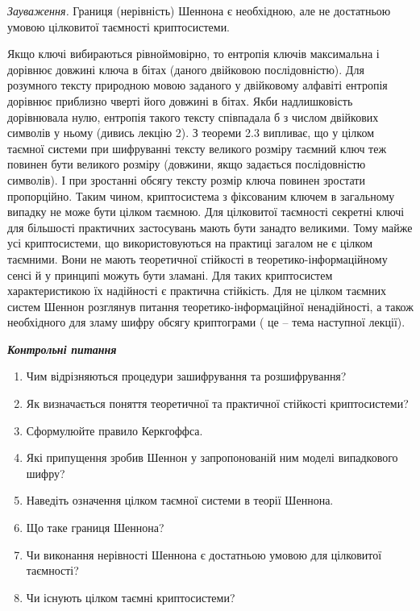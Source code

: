 \documentclass[a4paper]{article}
\newcommand\liststyleWWviiiNumxlv{%
\renewcommand\theenumi{\arabic{enumi}}
\renewcommand\theenumii{\alph{enumii}}
\renewcommand\theenumiii{\roman{enumiii}}
\renewcommand\theenumiv{\arabic{enumiv}}
\renewcommand\labelenumi{\theenumi.}
\renewcommand\labelenumii{\theenumii.}
\renewcommand\labelenumiii{\theenumiii.}
\renewcommand\labelenumiv{\theenumiv.}
}
\newcounter{}
\begin{document}
\textit{Зауваження.} Границя (нерівність) Шеннона є необхідною, але не
достатньою умовою цілковитої таємності криптосистеми.

Якщо ключі вибираються рівноймовірно, то ентропія ключів максимальна і дорівнює
довжині ключа в бітах (даного двійковою послідовністю). Для розумного тексту
природною мовою заданого у двійковому алфавіті ентропія дорівнює приблизно
чверті його довжині в бітах. Якби надлишковість дорівнювала нулю, ентропія
такого тексту співпадала б з числом двійкових символів у ньому (дивись лекцію
2). З теореми 2.3 випливає, що у цілком таємної системи при шифруванні тексту
великого розміру таємний ключ теж повинен бути великого розміру (довжини, якщо
задається послідовністю символів). І при зростанні обсягу тексту розмір ключа
повинен зростати пропорційно. Таким чином, криптосистема з фіксованим ключем в
загальному випадку не може бути цілком таємною. Для цілковитої таємності
секретні ключі для більшості практичних застосувань мають бути занадто
великими. Тому майже усі криптосистеми, що використовуються на практиці загалом
не є цілком таємними. Вони не мають теоретичної стійкості в
теоретико-інформаційному сенсі й  у принципі можуть бути зламані. Для таких
криптосистем характеристикою їх надійності є практична стійкість. Для не цілком
таємних систем Шеннон розглянув питання теоретико-інформаційної ненадійності, а
також необхідного для зламу шифру обсягу криптограми ( це – тема наступної
лекції).


\bigskip

{\centering\bfseries\itshape
Контрольні питання
\par}


\bigskip


\bigskip

\liststyleWWviiiNumxlv
\begin{enumerate}
\item Чим відрізняються процедури зашифрування та розшифрування?
\item Як визначається поняття теоретичної та практичної стійкості криптосистеми?
\item Сформулюйте правило Керкгоффса.
\item Які припущення зробив Шеннон у запропонованій ним моделі випадкового
шифру?
\item Наведіть означення цілком таємної системи в теорії Шеннона.
\item Що таке границя Шеннона?
\item Чи виконання нерівності Шеннона є достатньою умовою для цілковитої
таємності?
\item Чи існують цілком таємні криптосистеми? 
\end{enumerate}
\end{document}

